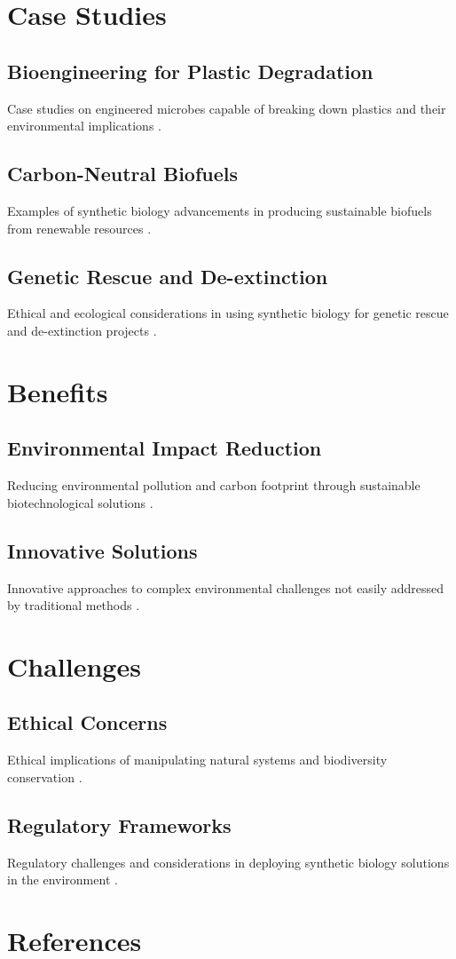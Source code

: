 \documentclass[12pt]{article}
\begin{document}
\section{Case Studies}
\subsection{Bioengineering for Plastic Degradation}
Case studies on engineered microbes capable of breaking down plastics and their environmental implications \citep{wei2020engineering, gajendiran2021plastic}.

\subsection{Carbon-Neutral Biofuels}
Examples of synthetic biology advancements in producing sustainable biofuels from renewable resources \citep{paterlini2021synthetic, verma2016synthetic}.

\subsection{Genetic Rescue and De-extinction}
Ethical and ecological considerations in using synthetic biology for genetic rescue and de-extinction projects \citep{prowse2017should, vince2018wild}.

\section{Benefits}
\subsection{Environmental Impact Reduction}
Reducing environmental pollution and carbon footprint through sustainable biotechnological solutions \citep{chuang2020review, enrique2021role}.

\subsection{Innovative Solutions}
Innovative approaches to complex environmental challenges not easily addressed by traditional methods \citep{purnick2009design, ratner2020synthetic}.

\section{Challenges}
\subsection{Ethical Concerns}
Ethical implications of manipulating natural systems and biodiversity conservation \citep{redford2015synthetic, keulartz2013ecology}.

\subsection{Regulatory Frameworks}
Regulatory challenges and considerations in deploying synthetic biology solutions in the environment \citep{garfinkel2017synthetic, magner2020synthetic}.

\section*{References}


\end{document}
